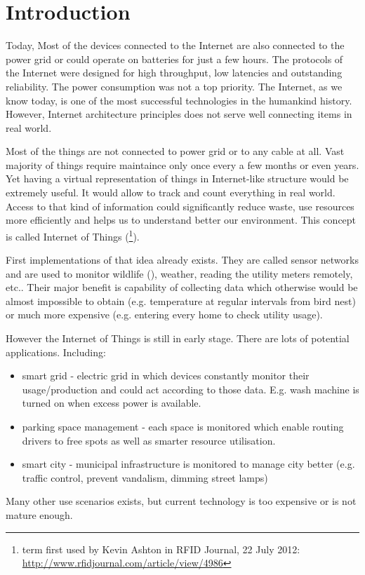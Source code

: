 \chapter*{Introduction}

Today, Most of the devices connected to the Internet are also connected to the power grid or could operate on batteries for just a few hours. The protocols of the Internet were designed for high throughput, low latencies and outstanding reliability. The power consumption was not a top priority. The Internet, as we know today, is one of the most successful technologies in the humankind history. However, Internet architecture principles does not serve well connecting items in real world.

Most of the things are not connected to power grid or to any cable at all. Vast majority of things require maintaince only once every a few months or even years. Yet having a virtual representation of things in Internet-like structure would be extremely useful. It would allow to track and count everything in real world. Access to that kind of information could significantly reduce waste, use resources more efficiently and helps us to understand better our environment. This concept is called Internet of Things (\footnote{term first used by Kevin Ashton in RFID Journal, 22 July 2012: \url{http://www.rfidjournal.com/article/view/4986}}). 


First implementations of that idea already exists. They are called sensor networks and are used to monitor wildlife (\cite{liu2009long}), weather, reading the utility meters remotely, etc..  Their major benefit is capability of collecting data which otherwise would be almost impossible to obtain (e.g. temperature at regular intervals from bird nest) or much more expensive (e.g. entering every home to check utility usage).

However the Internet of Things is still in early stage. There are lots of potential applications. Including:
\begin{itemize}
  \item smart grid - electric grid in which devices constantly monitor their usage/production and could act according to those data. E.g. wash machine is turned on when excess power is available.
  \item parking space management - each space is monitored which enable routing drivers to free spots as well as smarter resource utilisation.
  \item smart city - municipal infrastructure is monitored to manage city better (e.g. traffic control, prevent vandalism, dimming street lamps)
\end{itemize}
Many other use scenarios exists, but current technology is too expensive or is not mature enough.


